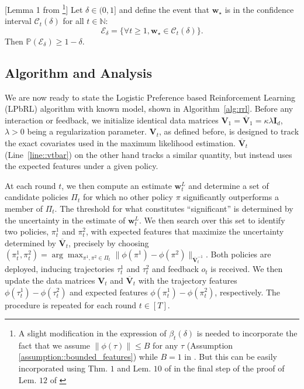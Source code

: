 \begin{lemma}
\label{lemma::confidence_interval_anytime} [Lemma 1 from \cite{faury2020improved}\footnote{A slight modification in the expression of $\beta_t(\delta)$ is needed to incorporate the fact that we assume $\|\phi(\tau)\| \leq B$ for any $\tau$ (Assumption \ref{assumption::bounded_features}) while $B = 1$ in \cite{faury2020improved}. But this can be easily incorporated using Thm. $1$ and Lem. $10$ of \cite{abbasi2011improved} in the final step of the proof of Lem. $12$ of \cite{faury2020improved}}] Let $\delta \in (0,1]$ and define the event that ${\mathbf w}_\star$ is in the confidence interval $\mathcal{C}_t(\delta)$ for all $t \in \mathbb{N}$:
\begin{equation*}
    \mathcal{E}_\delta = \{ \forall t \geq 1,  {\mathbf w}_\star \in \mathcal{C}_t(\delta) \}.
\end{equation*}
Then $\mathbb{P}( \mathcal{E}_\delta ) \geq 1-\delta$. 
\end{lemma}

\subsection{Algorithm and Analysis}

We are now ready to state the Logistic Preference based Reinforcement Learning  (LPbRL) algorithm with known model, shown in Algorithm~\ref{alg:rrl}. Before any interaction or feedback, we initialize identical data matrices ${\mathbf V}_1 = \overline {\mathbf V}_1 = \kappa\lambda {\mathbf I}_d$, $\lambda > 0$ being a regularization parameter. ${\mathbf V}_t$, as defined before, is designed to track the exact covariates used in the maximum likelihood estimation. $\overline {\mathbf V}_t$ (Line~\ref{line::vtbar}) on the other hand tracks a similar quantity, but instead uses the expected features under a given policy. 

At each round $t$, we then compute an estimate ${\mathbf w}_t^L$ and determine a set of candidate policies $\Pi_t$ for which no other policy $\pi$ significantly outperforms a member of $\Pi_t$. The threshold for what constitutes ``significant'' is determined by the uncertainty in the estimate of ${\mathbf w}_t^L$. We then search over this set to identify two policies, $\pi_t^1$ and $\pi_t^2$, with expected features that maximize the uncertainty determined by $\overline {\mathbf V}_t$, precisely by choosing $(\pi_t^1, \pi_t^2) = \arg\max_{ \pi^1, \pi^2 \in \Pi_t} \| \phi(\pi^1) - \phi(\pi^2) \|_{\overline {\mathbf V}_t^{-1}}$. Both policies are deployed, inducing trajectories $\tau_t^1$ and $\tau_t^2$ and feedback $o_t$ is received. We then update the data matrices ${\mathbf V}_t$ and $\overline {\mathbf V}_t$ with the trajectory features $\phi(\tau_t^1 ) - \phi(\tau_t^2)$ and expected features $\phi(\pi_t^1) - \phi(\pi_t^2)$, respectively. The procedure is repeated for each round $t \in [T]$.

